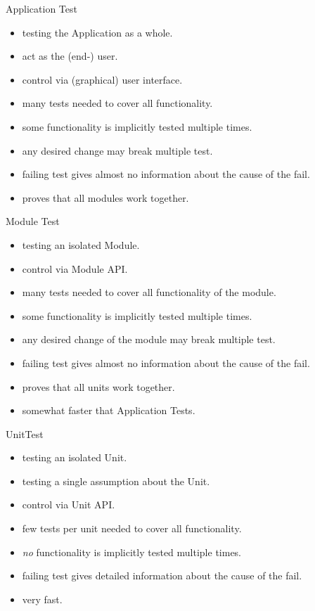 \documentclass[SoftwareQuality.tex]{subfiles}
\begin{document}
\begin{frame}{Application Test} 
\begin{itemize}
\item testing the Application as a whole.
\item act as the (end-) user.
\item control via (graphical) user interface.
\item many tests needed to cover all functionality.
\item some functionality is implicitly tested multiple times.
\item any desired change may break multiple test.
\item failing test gives almost no information about the cause of the fail.
\item proves that all modules work together.
\end{itemize}

\end{frame}


\begin{frame}{Module Test} 
\begin{itemize}
\item testing an isolated Module.
\item control via Module API.
\item many tests needed to cover all functionality of the module.
\item some functionality is implicitly tested multiple times.
\item any desired change of the module may break multiple test.
\item failing test gives almost no information about the cause of the fail.
\item proves that all units work together.
\item somewhat faster that Application Tests.
\end{itemize}

\end{frame}

\begin{frame}{UnitTest} 
\begin{itemize}
\item testing an isolated Unit.
\item testing a single assumption about the Unit.
\item control via Unit API.
\item few tests per unit needed to cover all functionality.
\item \textit{no} functionality is implicitly tested multiple times.
\item failing test gives detailed information about the cause of the fail.
\item very fast.
\end{itemize}

\end{frame}
\end{document}
